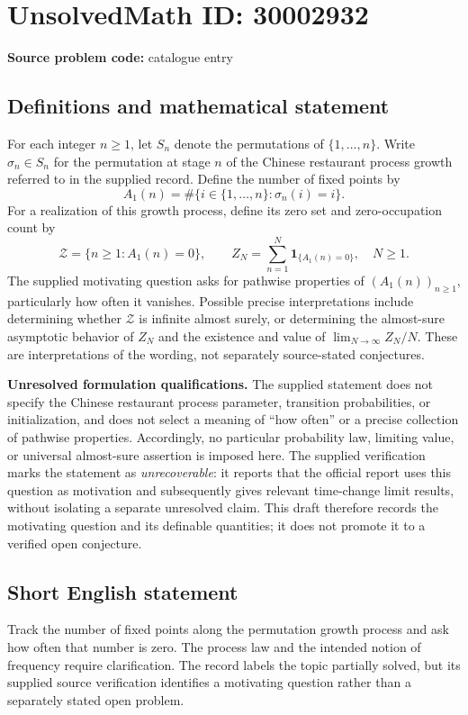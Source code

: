 \documentclass[11pt]{article}
\begin{document}
\section*{UnsolvedMath ID: 30002932}
\textbf{Source problem code:} catalogue entry
\subsection{Definitions and mathematical statement}
For each integer \(n\geq 1\), let \(S_n\) denote the permutations of \(\{1,\ldots,n\}\). Write \(\sigma_n\in S_n\) for the permutation at stage \(n\) of the Chinese restaurant process growth referred to in the supplied record. Define the number of fixed points by
\[
A_1(n)=\#\{i\in\{1,\ldots,n\}:\sigma_n(i)=i\}.
\]
For a realization of this growth process, define its zero set and zero-occupation count by
\[
\mathcal Z=\{n\geq1:A_1(n)=0\},\qquad
Z_N=\sum_{n=1}^{N}\mathbf 1_{\{A_1(n)=0\}},\quad N\geq1.
\]
The supplied motivating question asks for pathwise properties of \((A_1(n))_{n\geq1}\), particularly how often it vanishes. Possible precise interpretations include determining whether \(\mathcal Z\) is infinite almost surely, or determining the almost-sure asymptotic behavior of \(Z_N\) and the existence and value of \(\lim_{N\to\infty}Z_N/N\). These are interpretations of the wording, not separately source-stated conjectures.

\textbf{Unresolved formulation qualifications.} The supplied statement does not specify the Chinese restaurant process parameter, transition probabilities, or initialization, and does not select a meaning of ``how often'' or a precise collection of pathwise properties. Accordingly, no particular probability law, limiting value, or universal almost-sure assertion is imposed here. The supplied verification marks the statement as \emph{unrecoverable}: it reports that the official report uses this question as motivation and subsequently gives relevant time-change limit results, without isolating a separate unresolved claim. This draft therefore records the motivating question and its definable quantities; it does not promote it to a verified open conjecture.
\subsection{Short English statement}
Track the number of fixed points along the permutation growth process and ask how often that number is zero. The process law and the intended notion of frequency require clarification. The record labels the topic partially solved, but its supplied source verification identifies a motivating question rather than a separately stated open problem.
\end{document}
